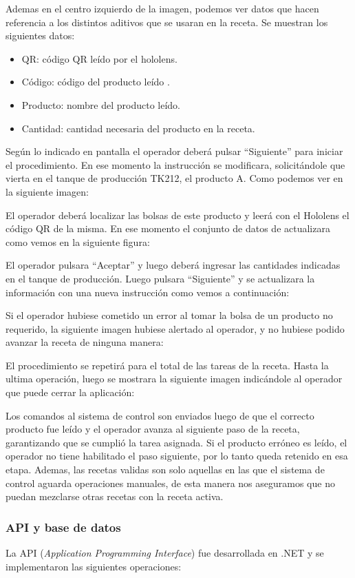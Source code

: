 Ademas en el centro izquierdo de la imagen, podemos ver datos que hacen referencia a los distintos aditivos que se usaran en la receta. Se muestran los siguientes datos:

\begin{itemize}
\item QR: código QR leído por el hololens.
\item Código: código del producto leído .
\item Producto: nombre del producto leído. 
\item Cantidad: cantidad necesaria del producto en la receta.
\end{itemize}

Según lo indicado en pantalla el operador deberá pulsar ``Siguiente'' para iniciar el procedimiento. En ese momento la instrucción se modificara, solicitándole que vierta en el tanque de producción TK212, el producto A. Como podemos ver en la siguiente imagen:


El operador deberá localizar las bolsas de este producto y leerá con el Hololens el código QR de la misma. En ese momento el conjunto de datos de actualizara como vemos en la siguiente figura:


El operador pulsara ``Aceptar'' y luego deberá  ingresar las cantidades indicadas en el tanque de producción. Luego pulsara ``Siguiente'' y se actualizara la información con una nueva instrucción como vemos a continuación:

Si el operador hubiese cometido un error al tomar la bolsa de un producto no requerido, la siguiente imagen hubiese alertado al operador, y no hubiese podido avanzar la receta de ninguna manera:


El procedimiento se repetirá para el total de las tareas de la receta. Hasta la ultima operación, luego se mostrara la siguiente imagen indicándole al operador que puede cerrar la aplicación:


Los comandos al sistema de control son enviados luego de que el correcto producto fue leído y el operador avanza al siguiente paso de la receta, garantizando que se cumplió la tarea asignada. Si el producto erróneo es leído, el operador no tiene habilitado el paso siguiente, por lo tanto queda retenido en esa etapa. Ademas, las recetas validas son solo aquellas en las que el sistema de control aguarda operaciones manuales, de esta manera nos aseguramos que no puedan mezclarse otras recetas con la receta activa.

\subsubsection{API y base de datos}
La API (\textit{Application Programming Interface}) fue desarrollada en .NET y se implementaron las siguientes operaciones:

